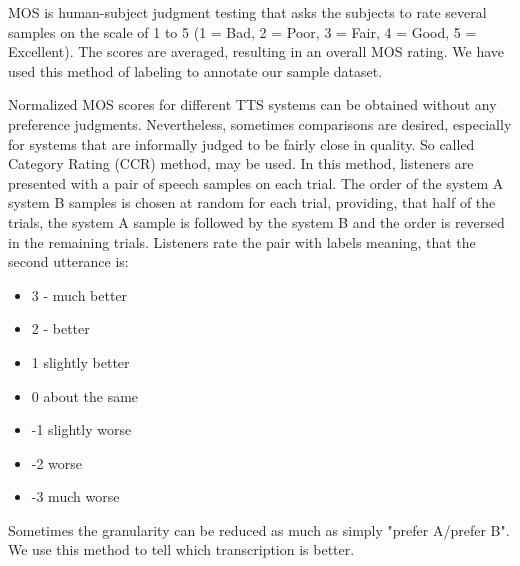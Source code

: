 MOS is human-subject judgment testing that asks the subjects to rate several samples on the scale of 1 to 5 (1 = Bad, 2 = Poor, 3 = Fair, 4 = Good, 5 = Excellent).
The scores are averaged, resulting in an overall MOS rating.
We have used this method of labeling to annotate our sample dataset.
\par
Normalized MOS scores for different TTS systems can be obtained without any preference judgments.
Nevertheless, sometimes comparisons are desired, especially for systems that are informally judged to be fairly close in quality.
So called Category Rating (CCR) method, may be used.
In this method, listeners are presented with a pair of speech samples on each trial. The order of the system A system B samples is chosen at random for each trial, providing, that half of the trials, the system A sample is followed by the system B and the order is reversed in the remaining trials.
Listeners rate the pair with labels meaning, that the second utterance is:
\begin{itemize}
\item 3 - much better
\item 2 - better
\item 1 slightly better
\item 0 about the same
\item -1 slightly worse
\item -2 worse
\item -3 much worse
\end{itemize}
Sometimes the granularity can be reduced as much as simply "prefer A/prefer B".
We use this method to tell which transcription is better.
